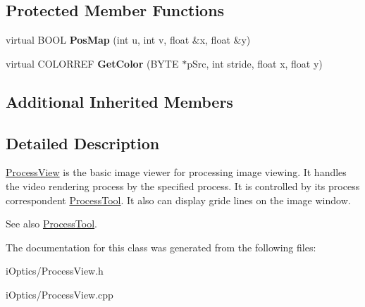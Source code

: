 \subsection*{Protected Member Functions}
\begin{DoxyCompactItemize}
\item 
\mbox{\label{class_process_view_af3bae21acece6d1027a873abb06bc26f}} 
virtual B\+O\+OL {\bfseries Pos\+Map} (int u, int v, float \&x, float \&y)
\item 
\mbox{\label{class_process_view_ae4c2be79e8aa2b37e2761801555975ae}} 
virtual C\+O\+L\+O\+R\+R\+EF {\bfseries Get\+Color} (B\+Y\+TE $\ast$p\+Src, int stride, float x, float y)
\end{DoxyCompactItemize}
\subsection*{Additional Inherited Members}


\subsection{Detailed Description}
\mbox{\hyperlink{class_process_view}{Process\+View}} is the basic image viewer for processing image viewing. It handles the video rendering process by the specified process. It is controlled by its process correspondent \mbox{\hyperlink{class_process_tool}{Process\+Tool}}. It also can display gride lines on the image window. 

\begin{DoxySeeAlso}{See also}
\mbox{\hyperlink{class_process_tool}{Process\+Tool}}. 
\end{DoxySeeAlso}


The documentation for this class was generated from the following files\+:\begin{DoxyCompactItemize}
\item 
i\+Optics/Process\+View.\+h\item 
i\+Optics/Process\+View.\+cpp\end{DoxyCompactItemize}
